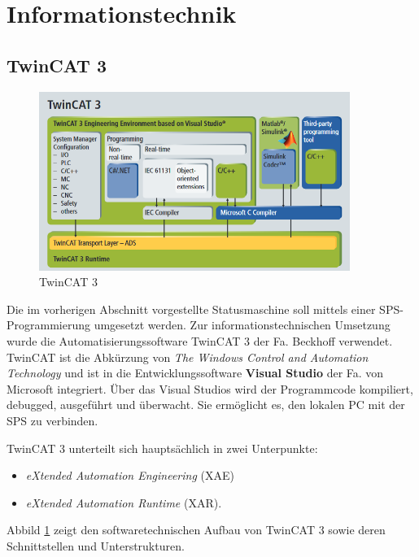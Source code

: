 \section{Informationstechnik}


\subsection*{TwinCAT 3}
\label{subsec:TwinCat}

\begin{figure}[htb]
\centering		\includegraphics[width=0.90\textwidth]{Pictures/TwinCat3_Beckhoff.png}
\caption{TwinCAT 3 \citep{Beckhoff2016}}
\label{fig:TwinCAT}
\end{figure}


Die im vorherigen Abschnitt vorgestellte Statusmaschine soll mittels einer SPS-Programmierung umgesetzt werden. Zur informationstechnischen Umsetzung wurde die Automatisierungssoftware TwinCAT 3 der Fa. Beckhoff verwendet. TwinCAT ist die Abkürzung von \textit{The Windows Control and Automation Technology} und  ist in die Entwicklungssoftware \textbf{Visual Studio} der Fa.  von Microsoft integriert. Über das Visual Studios wird der Programmcode kompiliert, debugged, ausgeführt und überwacht. Sie ermöglicht es, den lokalen PC mit der SPS zu verbinden. 

TwinCAT 3 unterteilt sich hauptsächlich in zwei Unterpunkte: 

\begin{itemize}
\item	\textit{eXtended Automation Engineering} (XAE)
\item	\textit{eXtended Automation Runtime} (XAR).
\end{itemize}

Abbild \ref{fig:TwinCAT} zeigt den softwaretechnischen Aufbau von TwinCAT 3 sowie deren Schnittstellen und Unterstrukturen.

